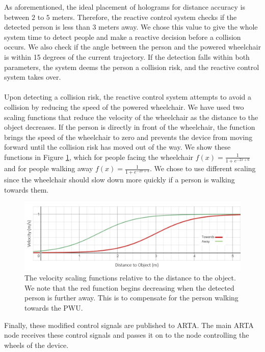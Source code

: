 As aforementioned, the ideal placement of holograms for distance accuracy is between $2$ to $5$ meters. Therefore, the reactive control system checks if the detected person is less than $3$ meters away. We chose this value to give the whole system time to detect people and make a reactive decision before a collision occurs. We also check if the angle between the person and the powered wheelchair is within 15 degrees of the current trajectory. If the detection falls within both parameters, the system deems the person a collision risk, and the reactive control system takes over.

\paragraph{} Upon detecting a collision risk, the reactive control system attempts to avoid a collision by reducing the speed of the powered wheelchair. We have used two scaling functions that reduce the velocity of the wheelchair as the distance to the object decreases. If the person is directly in front of the wheelchair, the function brings the speed of the wheelchair to zero and prevents the device from moving forward until the collision risk has moved out of the way. We show these functions in Figure \ref{fig:distanceScalingFunctions}, which for people facing the wheelchair $f(x)=\frac{1}{1 + e^{-2x+6}}$ and for people walking away $f(x)=\frac{1}{1 + e^{-2x+3}}$. We chose to use different scaling since the wheelchair should slow down more quickly if a person is walking towards them.

\begin{figure}[ht]
    \centering
    \includegraphics[width=0.8\linewidth]{img/chapter5_implementation/distanceScaling.PNG}
    \caption{The velocity scaling functions relative to the distance to the object. We note that the red function begins decreasing when the detected person is further away. This is to compensate for the person walking towards the PWU.}
    \label{fig:distanceScalingFunctions}
\end{figure} 

Finally, these modified control signals are published to ARTA. The main ARTA node receives these control signals and passes it on to the node controlling the wheels of the device.

